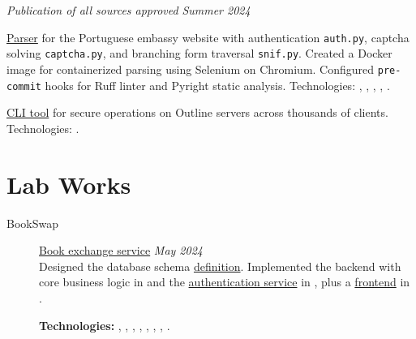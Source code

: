 \documentclass[margin,line]{resume}
\begin{document}
\begin{resume}
\begin{description}
\begin{list2}
        \vspace{2mm}

      \end{list2}
    \item[Other Projects]\small{
        \begingroup
        \textcolor{gray!40}{\textit{Publication of all sources approved}}
        \endgroup
      }{\hfill
      \textsl{Summer 2024}}\vspace{2mm}
      \begin{list2}

      \item{\href{https://github.com/alchemmist/portu-hack}{Parser}
          for the Portuguese embassy website with authentication
          \texttt{auth.py}, captcha solving \texttt{captcha.py}, and
          branching form traversal \texttt{snif.py}. Created a Docker
          image for containerized parsing using Selenium on Chromium.
          Configured \texttt{pre-commit} hooks for Ruff linter and
          Pyright static analysis. Technologies: ,
          , ,
        , .}

        \vspace{2mm}

      \item{\href{https://github.com/alchemmist/outline-vpn-cli}{CLI
          tool} for secure operations on Outline servers across
        thousands of clients. Technologies: .}
      \end{list2}

  \end{description}

  \section{\mysidestyle Lab Works}\vspace{2mm}

  \begin{description}

    \item[BookSwap]\small{\href{https://github.com/alchemmist/bookswap}{Book
        exchange service} \hfill
      \textsl{May 2024}\vspace{1mm}}\\
      Designed the database schema
      \href{https://github.com/alchemmist/bookswap/blob/dev/backend/src/main/resources/schema.sql}{definition}.
      Implemented the backend with core business logic in
       and the
      \href{https://github.com/alchemmist/bookswap/tree/dev/auth-service}{authentication
      service} in , plus a
      \href{https://github.com/alchemmist/bookswap/tree/dev/frontend}{frontend}
      in .

      \textbf{Technologies:} ,
      , ,
      , , ,
      , .

  \end{description}
\end{resume}
\end{document}
